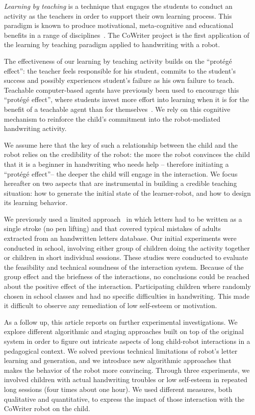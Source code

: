 \documentclass[conference]{IEEEtran}
\begin{document}
\emph{Learning by teaching} is a technique that engages the students to conduct an activity as the teachers in order to support their own learning process. This 
paradigm is known to produce motivational, meta-cognitive and educational
benefits in a range of disciplines~\cite{Rohrbeck2003}. The CoWriter project
is the first application of the learning by teaching paradigm applied to handwriting with a robot.

The effectiveness of our learning by teaching activity builds on the
``prot\'eg\'e effect'': the teacher feels responsible for his student, commits
to the student's success and possibly experiences student's failure as his own
failure to teach. Teachable computer-based agents have previously been used to
encourage this ``prot\'eg\'e effect'', where students invest more effort into
learning when it is for the benefit of a teachable agent than for themselves~\cite{Chase2009}.
We rely on this cognitive mechanism to reinforce the child's commitment into the
robot-mediated handwriting activity.

We assume here that the key of such a relationship between the child
and the robot relies on the credibility of the robot:
the more the robot convinces the child that it is a beginner in
handwriting who needs help -- therefore initiating a ``prot\'eg\'e effect''-- the deeper
the child will engage in the interaction. We focus hereafter on two aspects that are instrumental in building a
credible teaching situation: how to generate the initial state of the learner-robot, and how to design its
learning behavior.

We previously used a limited approach~\cite{hood2015when} in which
letters had to be written as a single stroke (no pen lifting) and that covered
typical mistakes of adults extracted from an handwritten letters database. Our initial experiments were conducted in school, involving either group of
children doing the activity together or children
in short individual sessions.
These studies were conducted to evaluate the feasibility and technical soundness
of the interaction system. Because of the group effect and the briefness of the
interactions, no conclusions could be reached about the positive effect of the
interaction. Participating children where randomly chosen in school
classes and had no specific difficulties in handwriting. This made it
difficult to observe any remediation of low self-esteem or motivation.

As a follow up, this article reports on further experimental investigations. We explore different algorithmic and staging approaches built on top of the original system in order to figure out intricate aspects of long child-robot interactions in a pedagogical context. We solved previous 
technical limitations of robot's letter learning and generation, and we introduce new algorithmic approaches that makes the behavior of the robot more convincing.
Through three experiments, we involved children with actual handwriting troubles or low 
self-esteem in repeated long sessions (four times about one hour). We used different
measures, both qualitative and quantitative, to express the impact of those
interaction with the CoWriter robot on the child.
\end{document}
